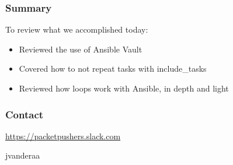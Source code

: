 \documentclass[aspectratio=169]{beamer}
\begin{document}
\begin{frame}
  \frametitle{Summary}
    To review what we accomplished today:
    \begin{itemize}
      \item <2-> Reviewed the use of Ansible Vault
      \item <3-> Covered how to not repeat tasks with include_tasks
      \item <4-> Reviewed how loops work with Ansible, in depth and light
    \end{itemize}
\end{frame}

\begin{frame}
    \frametitle{Contact}
    \huge
    \begin{center}
      \url{https://packetpushers.slack.com}
    \end{center}
    \begin{center}
      \normalsize
      \faSlack \hspace{.1cm}jvanderaa  
    \end{center}
  \end{frame}
\end{document}
